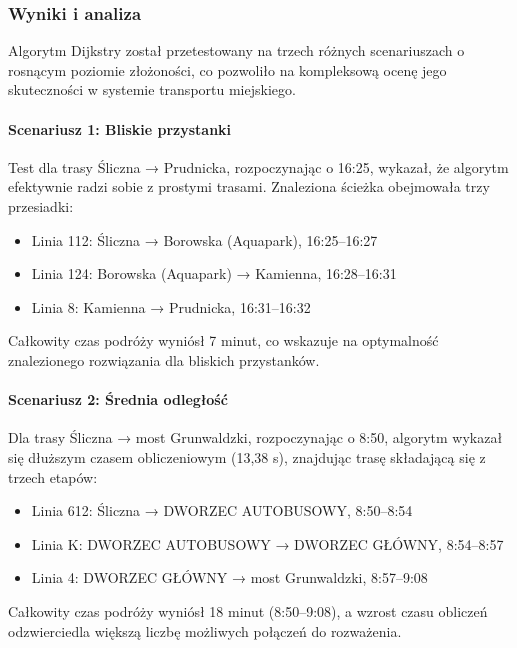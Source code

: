 \documentclass[12pt,a4paper]{article}
\begin{document}
\subsubsection{Wyniki i analiza}
Algorytm Dijkstry został przetestowany na trzech różnych scenariuszach o rosnącym poziomie złożoności, co pozwoliło na kompleksową ocenę jego skuteczności w systemie transportu miejskiego.

\paragraph{Scenariusz 1: Bliskie przystanki} 
Test dla trasy Śliczna → Prudnicka, rozpoczynając o 16:25, wykazał, że algorytm efektywnie radzi sobie z prostymi trasami. Znaleziona ścieżka obejmowała trzy przesiadki:
\begin{itemize}
    \item Linia 112: Śliczna → Borowska (Aquapark), 16:25--16:27
    \item Linia 124: Borowska (Aquapark) → Kamienna, 16:28--16:31
    \item Linia 8: Kamienna → Prudnicka, 16:31--16:32
\end{itemize}
Całkowity czas podróży wyniósł 7 minut, co wskazuje na optymalność znalezionego rozwiązania dla bliskich przystanków.

\paragraph{Scenariusz 2: Średnia odległość}
Dla trasy Śliczna → most Grunwaldzki, rozpoczynając o 8:50, algorytm wykazał się dłuższym czasem obliczeniowym (13,38 s), znajdując trasę składającą się z trzech etapów:
\begin{itemize}
    \item Linia 612: Śliczna → DWORZEC AUTOBUSOWY, 8:50--8:54
    \item Linia K: DWORZEC AUTOBUSOWY → DWORZEC GŁÓWNY, 8:54--8:57
    \item Linia 4: DWORZEC GŁÓWNY → most Grunwaldzki, 8:57--9:08
\end{itemize}
Całkowity czas podróży wyniósł 18 minut (8:50--9:08), a wzrost czasu obliczeń odzwierciedla większą liczbę możliwych połączeń do rozważenia.
\end{document}
